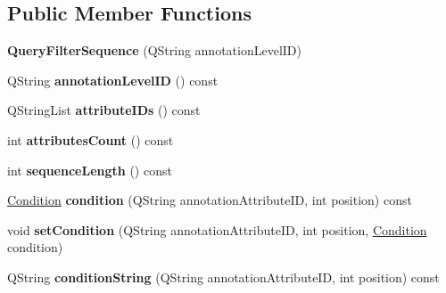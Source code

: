\subsection*{Public Member Functions}
\begin{DoxyCompactItemize}
\item 
\mbox{\label{class_query_filter_sequence_ac34ce006d68390c7367631da15ac9f28}} 
{\bfseries Query\+Filter\+Sequence} (Q\+String annotation\+Level\+ID)
\item 
\mbox{\label{class_query_filter_sequence_ab186d53f92f31eb5da5e92df3f3b1103}} 
Q\+String {\bfseries annotation\+Level\+ID} () const
\item 
\mbox{\label{class_query_filter_sequence_a72258722fba1802c7815beef74f80b9c}} 
Q\+String\+List {\bfseries attribute\+I\+Ds} () const
\item 
\mbox{\label{class_query_filter_sequence_af82815ef6f8b92cae8b012c1b24f14b9}} 
int {\bfseries attributes\+Count} () const
\item 
\mbox{\label{class_query_filter_sequence_affbbf11fe2c4c1de13b7557b2235fe46}} 
int {\bfseries sequence\+Length} () const
\item 
\mbox{\label{class_query_filter_sequence_a08cf11a89abdbeacb32bfa9db3cb673f}} 
\hyperlink{struct_query_filter_sequence_1_1_condition}{Condition} {\bfseries condition} (Q\+String annotation\+Attribute\+ID, int position) const
\item 
\mbox{\label{class_query_filter_sequence_a14683d88a182b6667c21c28bfd484ec0}} 
void {\bfseries set\+Condition} (Q\+String annotation\+Attribute\+ID, int position, \hyperlink{struct_query_filter_sequence_1_1_condition}{Condition} condition)
\item 
\mbox{\label{class_query_filter_sequence_a14ffa792fd71f32401846de0d1abace8}} 
Q\+String {\bfseries condition\+String} (Q\+String annotation\+Attribute\+ID, int position) const
\item 
\mbox{\label{class_query_filter_sequence_a46162d921641ed743e1d21efa53e749f}} 

\end{DoxyCompactItemize}
